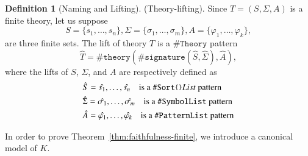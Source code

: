 \documentclass[UTF8,11pt]{article}
\newcounter{thmcounter}
\theoremstyle{plain}
\theoremstyle{definition}
\newtheorem{definition} [thmcounter]{Definition}
\theoremstyle{remark}
\newcommand{\parametric}[2]{{#1}\raisebox{.2ex}{\texttt{\footnotesize{\{}}}#2\raisebox{.2ex}{\texttt{\footnotesize{\}}}}}
\newcommand{\sharpsymbol}{\#}
\newcommand{\KSort}{\texttt{\sharpsymbol Sort}}
\newcommand{\KPatternList}{\texttt{\sharpsymbol PatternList}}
\newcommand{\KSymbolList}{\texttt{\sharpsymbol SymbolList}}
\newcommand{\Ksignature}{\texttt{\sharpsymbol signature}}
\newcommand{\KTheory}{\texttt{\sharpsymbol Theory}}
\newcommand{\Ktheory}{\texttt{\sharpsymbol theory}}
\begin{document}
\begin{definition}[Naming and Lifting]
 (Theory-lifting). Since $T = (S, \Sigma, A)$ is a finite theory, let us
 suppose
 \begin{equation*}
 S = \{ s_1, \dots, s_n \},
 \Sigma = \{ \sigma_1, \dots, \sigma_m \},
 A = \{ \varphi_1, \dots, \varphi_k \},
 \end{equation*}
 are three finite sets. The lift of theory $T$ is a $\KTheory$ pattern
 $$ \hat{T} = \Ktheory(\Ksignature(\hat{S}, \hat{\Sigma}), \hat{A}),$$
 where the lifts of $S$, $\Sigma$, and $A$ are respectively defined as
 \begin{align*}
 & \hat{S} = \hat{s_1},\dots,\hat{s_n}
 \quad \text{is a $\parametric{\KSort}{}List$ pattern}
 \\
 & \hat{\Sigma} = \hat{\sigma_1},\dots,\hat{\sigma_m}
 \quad \text{is a $\KSymbolList$ pattern}
 \\
 & \hat{A} = \hat{\varphi_1}, \dots, \hat{\varphi_k}
 \quad \text{is a $\KPatternList$ pattern}
 \end{align*}
\end{definition}

In order to prove Theorem~\ref{thm:faithfulness-finite}, we introduce a
canonical model of $K$.
\end{document}
